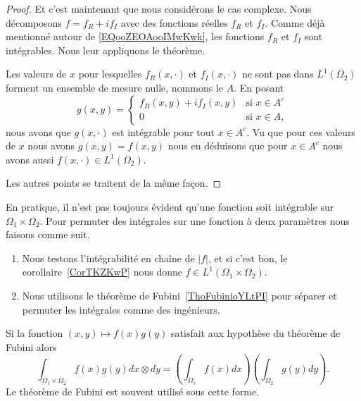 \begin{proof}
    Et c'est maintenant que nous considérons le cas complexe. Nous décomposons \( f=f_R+if_I\) avec des fonctions réelles \( f_R\) et \( f_I\). Comme déjà mentionné autour de \eqref{EQooZEOAooIMwKwk}, les fonctions \( f_R\) et \( f_I\) sont intégrables. Nous leur appliquons le théorème.

    Les valeurs de \( x\) pour lesquelles \( f_R(x,\cdot)\) et \( f_I(x,\cdot)\) ne sont pas dans \( L^1(\Omega_2)\) forment un ensemble de mesure nulle, nommons le \( A\). En posant
    \begin{equation}
        g(x,y)=\begin{cases}
            f_R(x,y)+if_I(x,y)    &   \text{si } x\in A^c\\
            0    &    \text{si } x\in A,
        \end{cases}
    \end{equation}
    nous avons que \( g(x,\cdot)\) est intégrable pour tout \( x\in A^c\). Vu que pour ces valeurs de \( x\) nous avons \( g(x,y)=f(x,y)\) nous en déduisons que pour \( x\in A^c\) nous avons aussi \( f(x,\cdot)\in L^1(\Omega_2)\).

    Les autres points se traitent de la même façon.
\end{proof}

\begin{normaltext}      \label{NORMooKIRJooPvyPWQ}
    En pratique, il n'est pas toujours évident qu'une fonction soit intégrable sur \( \Omega_1\times \Omega_2\). Pour permuter des intégrales sur une fonction à deux paramètres nous faisons comme suit.
    \begin{enumerate}
        \item
            Nous testons l'intégrabilité en chaîne de \( | f |\), et si c'est bon, le corollaire~\ref{CorTKZKwP} nous donne \( f\in L^1(\Omega_1\times \Omega_2)\).
        \item
            Nous utilisons le théorème de Fubini~\ref{ThoFubinioYLtPI} pour séparer et permuter les intégrales comme des ingénieurs.
    \end{enumerate}

    Si la fonction \( (x,y)\mapsto f(x)g(y)\) satisfait aux hypothèse du théorème de Fubini alors
    \begin{equation}    \label{EqTJEEsJW}
        \int_{\Omega_1\times \Omega_2} f(x)g(y)dx\otimes dy=\left( \int_{\Omega_1}f(x)dx \right)\left( \int_{\Omega_2}g(y)dy \right).
    \end{equation}
    Le théorème de Fubini est souvent utilisé sous cette forme.

\end{normaltext}

